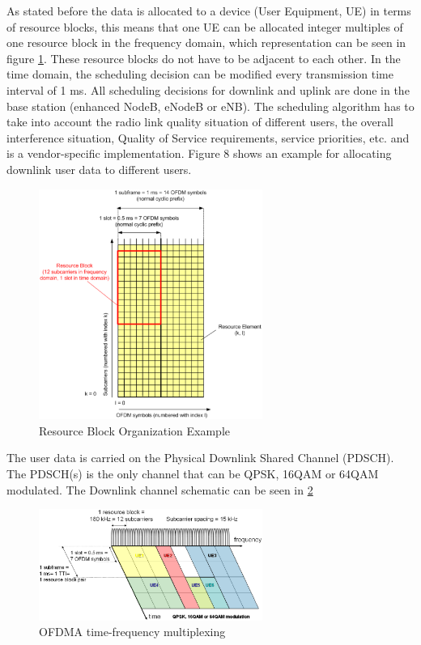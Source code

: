 As stated before the data is allocated to a device (User Equipment, UE) in terms
of resource blocks, this means that one UE can be allocated integer multiples of
one resource block in the frequency domain, which representation can be seen in
figure \ref{fig:ofdmresblk}. These resource blocks do not have to be adjacent to
each other. In the time domain, the scheduling decision can be modified every
transmission time interval of 1 ms. All scheduling decisions for downlink and
uplink are done in the base station (enhanced NodeB, eNodeB or eNB). The
scheduling algorithm has to take into account the radio link quality situation
of different users, the overall interference situation, Quality of Service
requirements, service priorities, etc. and is a vendor-specific implementation.
Figure 8 shows an example for allocating downlink user data to different
users.\\

\begin{figure}[htbp]
    \centering
    \includegraphics[width=0.65\textwidth]{./figures/ofdm_resource_block}
    \caption{ Resource Block Organization Example
    \label{fig:ofdmresblk}}
\end{figure}

The user data is carried on the Physical Downlink Shared Channel (PDSCH). The
PDSCH(s) is the only channel that can be QPSK, 16QAM or 64QAM modulated. The
Downlink channel schematic can be seen in \ref{fig:dlchann}

\begin{figure}[htbp]
    \centering
    \includegraphics[width=0.65\textwidth]{./figures/downlink_channels}
    \caption{ OFDMA time-frequency multiplexing
    \label{fig:dlchann}}
\end{figure}

